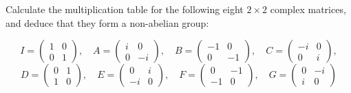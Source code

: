 \begin{exercise}
    Calculate the multiplication table for the following eight \(2 \times 2\) complex matrices, and deduce that they form a non-abelian group:

    \[
        I=\left(\begin{array}{rr}
                1 & 0 \\
                0 & 1
            \end{array}\right), \quad
        A=\left(\begin{array}{rr}
                i & 0  \\
                0 & -i
            \end{array}\right), \quad
        B=\left(\begin{array}{rr}
                - 1 & 0  \\
                0   & -1
            \end{array}\right), \quad
        C=\left(\begin{array}{rr}
                -i & 0 \\
                0  & i
            \end{array}\right), \]
    \[ D =\left(\begin{array}{rr}
                0 & 1 \\
                1 & 0
            \end{array}\right), \quad
        E =\left(\begin{array}{rr}
                0  & i \\
                -i & 0
            \end{array}\right), \quad
        F=\left(\begin{array}{rr}
                0  & -1 \\
                -1 & 0
            \end{array}\right), \quad
        G=\left(\begin{array}{rr}
                0 & -i \\
                i & 0
            \end{array}\right) \]
\end{exercise}

